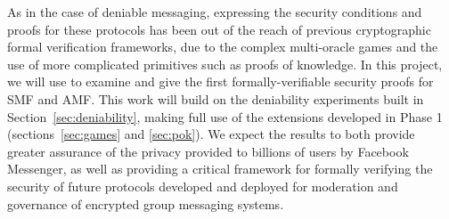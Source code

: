 As in the case of deniable messaging, expressing the security conditions and proofs for these protocols has been out of the reach of previous cryptographic formal verification frameworks, due to the complex multi-oracle games and the use of more complicated primitives such as proofs of knowledge.  
In this project, we will use \vcvio to examine and give the first formally-verifiable security proofs for SMF and AMF. 
This work will build on the deniability experiments built in Section~\ref{sec:deniability}, making full use of the extensions developed in Phase 1 (sections~\ref{sec:games} and \ref{sec:pok}).
We expect the results to both provide greater assurance of the privacy provided to billions of users by Facebook Messenger, as well as providing a critical framework for formally verifying the security of future protocols developed and deployed for moderation and governance of encrypted group messaging systems. 
